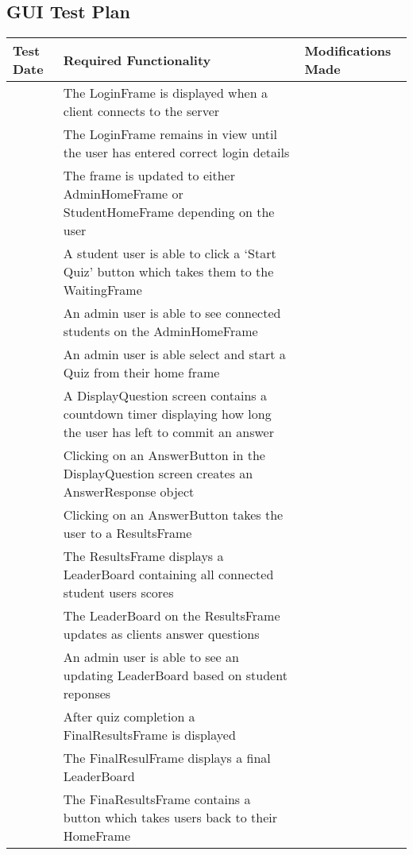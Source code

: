 \subsection{GUI Test Plan}
\label{sub:gui_test_plan}

\renewcommand{\arraystretch}{1.5}
\begin{longtabu}{l X X}
	\toprule
	Test Date	&Required Functionality 	&Modifications Made\\
	\midrule
	&The LoginFrame is displayed when a client connects to the server	&\\
	&The LoginFrame remains in view until the user has entered correct login details	&\\
	&The frame is updated to either AdminHomeFrame or StudentHomeFrame depending on the user	&\\
	&A student user is able to click a `Start Quiz' button which takes them to the WaitingFrame	&\\
	&An admin user is able to see connected students on the AdminHomeFrame	&\\
	&An admin user is able select and start a Quiz from their home frame	&\\
	&A DisplayQuestion screen contains a countdown timer displaying how long the user has left to commit an answer 	&\\
	&Clicking on an AnswerButton in the DisplayQuestion screen creates an AnswerResponse object	&\\
	&Clicking on an AnswerButton takes the user to a ResultsFrame	&\\
	&The ResultsFrame displays a LeaderBoard containing all connected student users scores	&\\
	&The LeaderBoard on the ResultsFrame updates as clients answer questions	&\\
	&An admin user is able to see an updating LeaderBoard based on student reponses	&\\
	&After quiz completion a FinalResultsFrame is displayed	&\\
	&The FinalResulFrame displays a final LeaderBoard	&\\
	&The FinaResultsFrame contains a button which takes users back to their HomeFrame	&\\
	\bottomrule
\end{longtabu}
